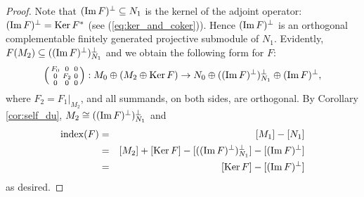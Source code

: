 \documentclass[12pt]{amsart}
\newcommand{\Ker}{\operatorname{Ker}}
\def\Ker{\mathop{\rm Ker}\nolimits}
\def\Im{\mathop{\rm Im}\nolimits}
\begin{document}
\begin{proof}
	Note that $(\Im F)^{\bot}\subseteq N_1$ is the kernel
	of the adjoint operator: $(\Im F)^{\bot}=\Ker F^*$ (see (\ref{eq:ker_and_coker})).
	Hence $(\Im F)^{\bot}$ is an orthogonal complementable 
	finitely generated projective submodule of $N_1$.
Evidently, $F(M_2)\subseteq ((\Im F)^\bot)^\bot_{N_1}$ and
	we obtain the following form for $F$:
	$$
	\left(\begin{smallmatrix}
		F_0&0&0\\
		0& F_2 & 0\\
		0& 0 & 0
	\end{smallmatrix}\right): M_0  \oplus (M_2 \oplus \Ker F)
\to N_0 \oplus ((\Im F)^\bot)^\bot_{N_1} \oplus (\Im F)^{\bot},
	$$
where $F_2=F_1|_{M_2}$, and all summands, on both sides, are orthogonal.
By Corollary \ref{cor:self_du}, $M_2 \cong ((\Im F)^\bot)^\bot_{N_1}$
and
\begin{eqnarray*}
\mathrm{index}(F)&=&[M_1]-[N_1]\\
&=&
[M_2]+[\Ker F]-[((\Im F)^\bot)^\bot_{N_1}]-[(\Im F)^{\bot}]\\
&=&[\Ker F]-[(\Im F)^\bot]
\end{eqnarray*}
as desired.	
\end{proof}	



%
%
%
\end{document}
